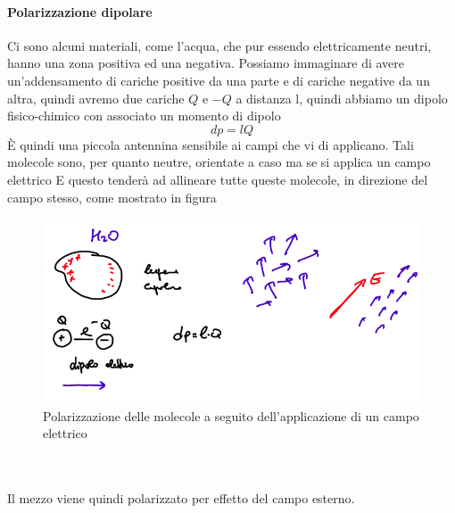 \documentclass[oneside, 12pt]{extbook}
\begin{document}
\paragraph{Polarizzazione dipolare}
Ci sono alcuni materiali, come l'acqua, che pur essendo elettricamente neutri, hanno una zona positiva ed una negativa. Possiamo immaginare di avere un'addensamento di cariche positive da una parte e di cariche negative da un altra, quindi avremo due cariche $Q$ e $-Q$ a distanza l, quindi abbiamo un dipolo fisico-chimico con associato un momento di dipolo 
\begin{equation}
	dp = lQ
\end{equation}
È quindi una piccola antennina sensibile ai campi che vi di applicano. Tali molecole sono, per quanto neutre, orientate a caso ma se si applica un campo elettrico E questo tenderà ad allineare tutte queste molecole, in direzione del campo stesso, come mostrato in figura 
\begin{figure}[!h]
	\includegraphics[scale=0.4]{immagini/pol_dip.png}
	\caption{Polarizzazione delle molecole a seguito dell'applicazione di un campo elettrico}
\end{figure}
\\\\Il mezzo viene quindi polarizzato per effetto del campo esterno.\\\\
\end{document}
